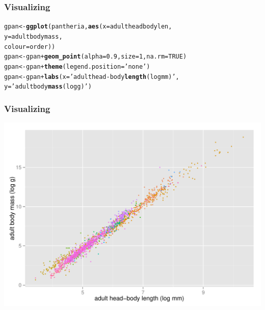 \documentclass{beamer}\usepackage{graphicx, color}
\makeatletter
\def\maxwidth{ %
  \ifdim\Gin@nat@width>\linewidth
    \linewidth
  \else
    \Gin@nat@width
  \fi
}
\newcommand{\hlfunctioncall}[1]{\textcolor[rgb]{0.501960784313725,0,0.329411764705882}{\textbf{#1}}}%
\newcommand{\hlstring}[1]{\textcolor[rgb]{0.6,0.6,1}{#1}}%
\newenvironment{kframe}{%
 \def\at@end@of@kframe{}%
 \ifinner\ifhmode%
  \def\at@end@of@kframe{\end{minipage}}%
  \begin{minipage}{\columnwidth}%
 \fi\fi%
 \def\FrameCommand##1{\hskip\@totalleftmargin \hskip-\fboxsep
 \colorbox{shadecolor}{##1}\hskip-\fboxsep
     \hskip-\linewidth \hskip-\@totalleftmargin \hskip\columnwidth}%
 \MakeFramed {\advance\hsize-\width
   \@totalleftmargin\z@ \linewidth\hsize
   \@setminipage}}%
 {\par\unskip\endMakeFramed%
 \at@end@of@kframe}
\newenvironment{knitrout}{}{} %
\makeatother
\begin{document}
\begin{frame}[fragile]
  \frametitle{Visualizing}
\begin{knitrout}\scriptsize
{}\color{fgcolor}\begin{kframe}
\begin{alltt}
gpan <- \hlfunctioncall{ggplot}(pantheria, \hlfunctioncall{aes}(x = adultheadbodylen,
                              y = adultbodymass,
                              colour = order))
gpan <- gpan + \hlfunctioncall{geom_point}(alpha = 0.9,  size = 1, na.rm = TRUE)
gpan <- gpan + \hlfunctioncall{theme}(legend.position = \hlstring{'none'})
gpan <- gpan + \hlfunctioncall{labs}(x = \hlstring{'adult head-body \hlfunctioncall{length} (log mm)'},
                    y = \hlstring{'adult body \hlfunctioncall{mass} (log g)'})
\end{alltt}
\end{kframe}
\end{knitrout}

\end{frame}

\begin{frame}[fragile]
  \frametitle{Visualizing}
\begin{knitrout}\scriptsize
{}\color{fgcolor}
\includegraphics[width=\maxwidth]{figure/unnamed-chunk-21} 

\end{knitrout}

\end{frame}
\end{document}
